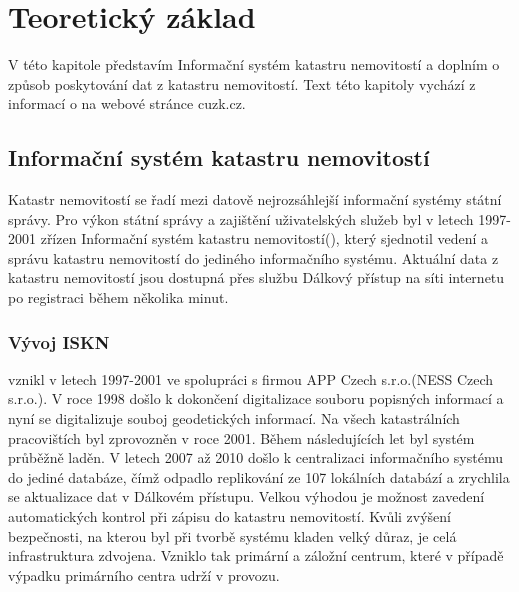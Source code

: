 \chapter{Teoretický základ}
\label{2-teorie}
V této kapitole představím Informační systém katastru nemovitostí a doplním o způsob poskytování dat z katastru nemovitostí. Text této kapitoly vychází z informací o  na webové stránce cuzk.cz. \cite{iskn}

\section{Informační systém katastru nemovitostí}
Katastr nemovitostí se řadí mezi datově nejrozsáhlejší informační systémy státní správy. Pro výkon státní správy a zajištění uživatelských služeb byl v letech 1997-2001 zřízen Informační systém katastru nemovitostí(), který sjednotil vedení a správu katastru nemovitostí do jediného informačního systému. Aktuální data z katastru nemovitostí jsou dostupná přes službu Dálkový přístup na síti internetu po registraci během několika minut. 
\subsection{Vývoj ISKN}
 vznikl v letech 1997-2001 ve spolupráci s firmou APP Czech s.r.o.(NESS Czech s.r.o.). V roce 1998 došlo k dokončení digitalizace souboru popisných informací a nyní se digitalizuje souboj geodetických informací. Na všech katastrálních pracovištích byl  zprovozněn v roce 2001. Během následujících let byl systém průběžně laděn. V letech 2007 až 2010 došlo k centralizaci informačního systému do jediné databáze, čímž odpadlo replikování ze 107 lokálních databází a zrychlila se aktualizace dat v Dálkovém přístupu. Velkou výhodou  je možnost zavedení automatických kontrol při zápisu do katastru nemovitostí. Kvůli zvýšení bezpečnosti, na kterou byl při tvorbě systému kladen velký důraz, je celá infrastruktura zdvojena. Vzniklo tak primární a záložní centrum, které v případě výpadku primárního centra udrží  v provozu.
